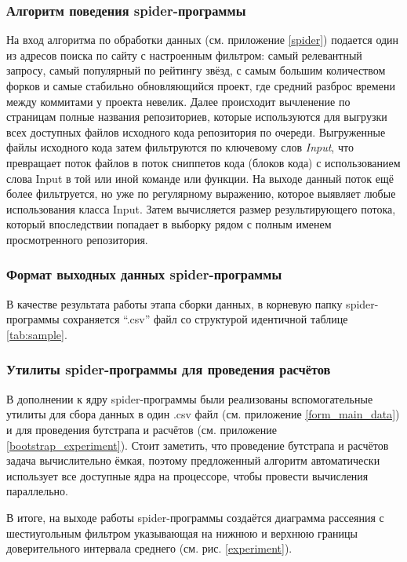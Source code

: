 \subsubsection*{Алгоритм поведения spider-программы}
На вход алгоритма по обработки данных (см. приложение \ref{spider}) подается один из адресов поиска по сайту с настроенным фильтром: самый релевантный запросу, самый популярный по рейтингу звёзд, с самым большим количеством форков и самые стабильно обновляющийся проект, где средний разброс времени между коммитами у проекта невелик. Далее происходит вычленение по страницам полные названия репозиториев, которые используются для выгрузки всех доступных файлов исходного кода репозитория по очереди. Выгруженные файлы исходного кода затем фильтруются по ключевому слов \textit{Input}, что превращает поток файлов в поток сниппетов кода (блоков кода) с использованием слова Input в той или иной команде или функции. На выходе данный поток ещё более фильтруется, но уже по регулярному выражению, которое выявляет любые использования класса Input. Затем вычисляется размер результирующего потока, который впоследствии попадает в выборку рядом с полным именем просмотренного репозитория.

\subsubsection*{Формат выходных данных spider-программы}
В качестве результата работы этапа сборки данных, в корневую папку spider-программы сохраняется ``.csv'' файл со структурой идентичной таблице \ref{tab:sample}.

\subsubsection*{Утилиты spider-программы для проведения расчётов}
В дополнении к ядру spider-программы были реализованы вспомогательные утилиты для сбора данных в один .csv файл (см. приложение \ref{form_main_data}) и для проведения бутстрапа и расчётов (см. приложение \ref{bootstrap_experiment}). Стоит заметить, что проведение бутстрапа и расчётов задача вычислительно ёмкая, поэтому предложенный алгоритм автоматически использует все доступные ядра на процессоре, чтобы провести вычисления параллельно. 

В итоге, на выходе работы spider-программы создаётся диаграмма рассеяния с шестиугольным фильтром указывающая на нижнюю и верхнюю границы доверительного интервала среднего (см. рис. \ref{experiment}).

